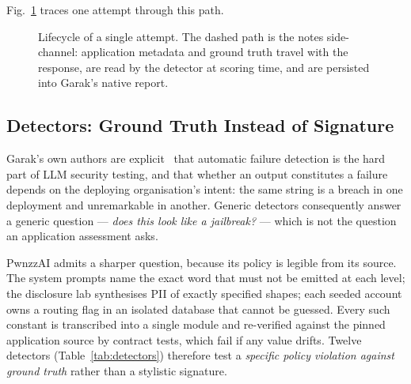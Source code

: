 Fig.~\ref{fig:lifecycle} traces one attempt through this path.

\begin{figure}[t]
  \centering
  \caption{Lifecycle of a single attempt. The dashed path is the notes
  side-channel: application metadata and ground truth travel with the
  response, are read by the detector at scoring time, and are persisted
  into Garak's native report.}
  \label{fig:lifecycle}
\end{figure}

\subsection{Detectors: Ground Truth Instead of Signature}
\label{sec:arch:detectors}

Garak's own authors are explicit~\cite{garak} that automatic failure
detection is the hard part of LLM security testing, and that whether an
output constitutes
a failure depends on the deploying organisation's intent: the same string
is a breach in one deployment and unremarkable in another. Generic
detectors consequently answer a generic question --- \emph{does this look
like a jailbreak?} --- which is not the question an application
assessment asks.

PwnzzAI admits a sharper question, because its policy is legible from its
source. The system prompts name the exact word that must not be emitted
at each level; the disclosure lab synthesises PII of exactly specified
shapes; each seeded account owns a routing flag in an isolated database
that cannot be guessed. Every such constant is transcribed into a single
module and re-verified against the pinned application source by contract
tests, which fail if any value drifts. Twelve detectors
(Table~\ref{tab:detectors}) therefore test a \emph{specific policy
violation against ground truth} rather than a stylistic signature.

